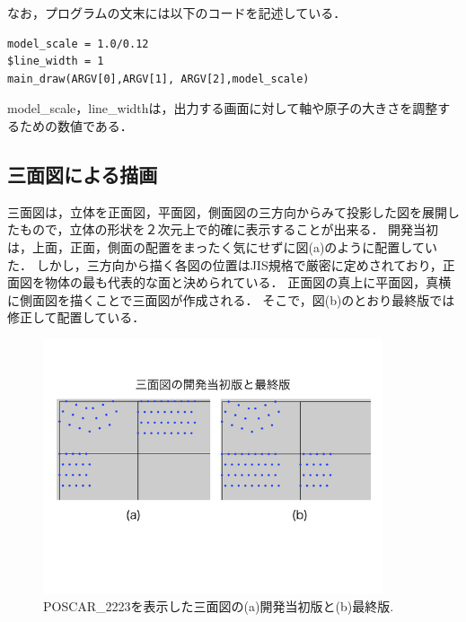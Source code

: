 なお，プログラムの文末には以下のコードを記述している．
\begin{lstlisting}[style=customRuby,basicstyle={\scriptsize\ttfamily}]
model_scale = 1.0/0.12
$line_width = 1
main_draw(ARGV[0],ARGV[1], ARGV[2],model_scale)
\end{lstlisting}
model\_scale，line\_widthは，出力する画面に対して軸や原子の大きさを調整するための数値である．

\subsection{三面図による描画}
三面図は，立体を正面図，平面図，側面図の三方向からみて投影した図を展開したもので，立体の形状を２次元上で的確に表示することが出来る．
開発当初は，上面，正面，側面の配置をまったく気にせずに図(a)のように配置していた．
しかし，三方向から描く各図の位置はJIS規格で厳密に定めされており，正面図を物体の最も代表的な面と決められている\cite{views}．
正面図の真上に平面図，真横に側面図を描くことで三面図が作成される．
そこで，図(b)のとおり最終版では修正して配置している．

\begin{figure}[htbp]\begin{center}
\includegraphics[width=10cm,bb= 0 0 737 553]{../figs/./boundary_narita.014.jpeg}
\caption{POSCAR\_2223を表示した三面図の(a)開発当初版と(b)最終版.}
\label{default}\end{center}\end{figure}

